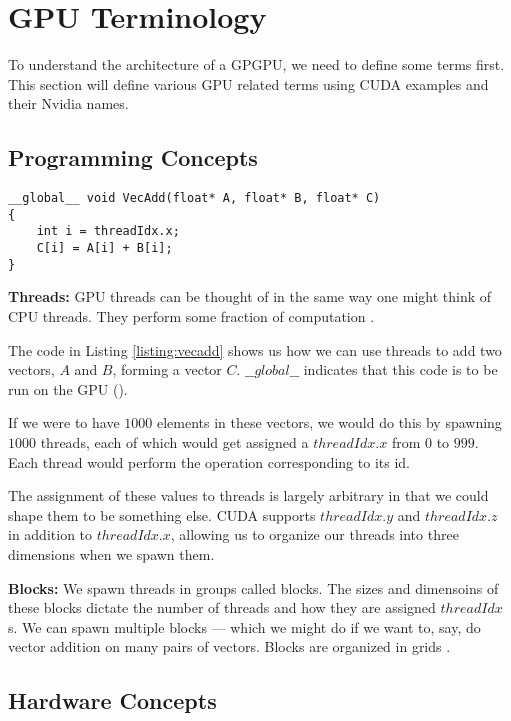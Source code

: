 \section{GPU Terminology}

To understand the architecture of a GPGPU, we need to define some terms first.
This section will define various GPU related terms using CUDA examples and their
Nvidia names. 

\subsection{Programming Concepts}

\begin{lstlisting}[caption=A simple CUDA example., label={listing:vecadd}]
__global__ void VecAdd(float* A, float* B, float* C)
{
    int i = threadIdx.x;
    C[i] = A[i] + B[i];
}

\end{lstlisting}


\textbf{Threads:} GPU threads can be thought of in the same way one might
think of CPU threads. They perform some fraction of computation \cite{nvidiaCUDAProgramming}.

The code in Listing \ref{listing:vecadd} shows us how we can use threads to add two vectors,
$A$ and $B$, forming a vector $C$. $\_\_global\_\_$ indicates that this code
is to be run on the GPU (\cite{nvidiaCUDAProgramming}).

If we were to have $1000$ elements in these vectors, we would do this 
by spawning $1000$ threads, each of which would get assigned a $threadIdx.x$
from $0$ to $999$. Each thread would perform the operation corresponding to
its id.

The assignment of these values to threads is largely arbitrary in that
we could shape them to be something else. CUDA supports $threadIdx.y$ and
$threadIdx.z$ in addition to $threadIdx.x$, allowing us to organize
our threads into three dimensions when we spawn them.

\textbf{Blocks:} We spawn threads in groups called blocks. The sizes
and dimensoins of these blocks dictate the number of threads and how they
are assigned $threadIdx$s. We can spawn multiple blocks --- which we might
do if we want to, say, do vector addition on many pairs of vectors.
Blocks are organized in grids \cite{nvidiaCUDAProgramming}.

\subsection{Hardware Concepts}

